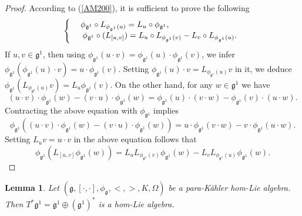 \documentclass[10pt]{amsart}
\numberwithin{equation}{section}
\newtheorem{lemma}[theorem]{Lemma}
\begin{document}
\begin{proof}
According to (\ref{AM200}), it is sufficient to prove the following
\begin{equation*}
\left\{
\begin{array}{cc}
 &\hspace{-3cm}{ \phi_{\mathfrak{g}^1}}\circ L_{{ \phi_{\mathfrak{g}^1}}(u)}=L_u\circ { \phi_{\mathfrak{g}^1}},\\
&{ \phi_{\mathfrak{g}^1}}\circ (L_{[u,v]})=L_u\circ L_{ \phi_{\mathfrak{g}^1}(v)}-L_v\circ L_{ \phi_{\mathfrak{g}^1}(u)}.
\end{array}
\right.
\end{equation*}
If $u,v\in \mathfrak{g}^1$, then using ${ \phi_{\mathfrak{g}^1}}(u\cdot v)={ \phi_{\mathfrak{g}^1}}(u)\cdot { \phi_{\mathfrak{g}^1}}(v)$, we infer ${ \phi_{\mathfrak{g}^1}}({ \phi_{\mathfrak{g}^1}}(u)\cdot v)=u\cdot { \phi_{\mathfrak{g}^1}}(v)$. Setting ${ \phi_{\mathfrak{g}^1}}(u)\cdot v=L_{ \phi_{\mathfrak{g}^1}(u)}v$ in it, we deduce ${ \phi_{\mathfrak{g}^1}}( L_{{ \phi_{\mathfrak{g}^1}}(u)}v)=L_u { \phi_{\mathfrak{g}^1}}(v)$.
On the other hand, for any $w\in\mathfrak{g}^1$ we have 
\[
(u\cdot v)\cdot{ \phi_{\mathfrak{g}^1}}(w)-(v\cdot u)\cdot{ \phi_{\mathfrak{g}^1}}(w)={ \phi_{\mathfrak{g}^1}}(u)\cdot(v\cdot w)-{ \phi_{\mathfrak{g}^1}}(v)\cdot(u\cdot w).
\]
Contracting the above equation with ${ \phi_{\mathfrak{g}^1}}$ implies 
\[
{ \phi_{\mathfrak{g}^1}}((u\cdot v)\cdot{ \phi_{\mathfrak{g}^1}}(w)-(v\cdot u)\cdot{ \phi_{\mathfrak{g}^1}}(w))=u\cdot{ \phi_{\mathfrak{g}^1}}(v\cdot w)-v\cdot{ \phi_{\mathfrak{g}^1}}(u\cdot w).
\]
Setting $L_uv=u\cdot v$ in the above equation follows that
\[
{ \phi_{\mathfrak{g}^1}}(L_{[u,v]}{ \phi_{\mathfrak{g}^1}}(w))=L_uL_{ \phi_{\mathfrak{g}^1}(v)}{ \phi_{\mathfrak{g}^1}}(w)-L_vL_{ \phi_{\mathfrak{g}^1}(u)}{ \phi_{\mathfrak{g}^1}}(w).
\]
\end{proof}
\begin{lemma}
Let $(\mathfrak{g}, [\cdot, \cdot], \phi_{\mathfrak{g}}, <,>, K,\Omega)$ be a para-K\"{a}hler hom-Lie algebra.
Then  $T^*\mathfrak{g}^1=\mathfrak{g}^1\oplus(\mathfrak{g}^1)^*$ is a hom-Lie algebra.
\end{lemma}
\end{document}
